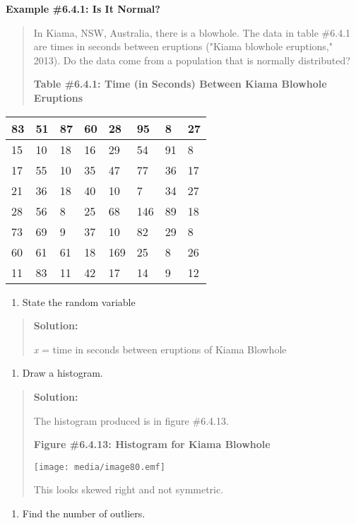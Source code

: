 \documentclass[]{book}
\providecommand{\tightlist}{%
  \setlength{\itemsep}{0pt}\setlength{\parskip}{0pt}}
\begin{document}
\textbf{Example \#6.4.1: Is It Normal?}

\begin{quote}
In Kiama, NSW, Australia, there is a blowhole. The data in table
\#6.4.1 are times in seconds between eruptions ("Kiama blowhole
eruptions," 2013). Do the data come from a population that is
normally distributed?

\textbf{Table \#6.4.1: Time (in Seconds) Between Kiama Blowhole Eruptions }
\end{quote}

\begin{longtable}[]{@{}llllllll@{}}
\toprule
83 & 51 & 87 & 60 & 28 & 95 & 8 & 27\tabularnewline
\midrule
\endhead
15 & 10 & 18 & 16 & 29 & 54 & 91 & 8\tabularnewline
17 & 55 & 10 & 35 & 47 & 77 & 36 & 17\tabularnewline
21 & 36 & 18 & 40 & 10 & 7 & 34 & 27\tabularnewline
28 & 56 & 8 & 25 & 68 & 146 & 89 & 18\tabularnewline
73 & 69 & 9 & 37 & 10 & 82 & 29 & 8\tabularnewline
60 & 61 & 61 & 18 & 169 & 25 & 8 & 26\tabularnewline
11 & 83 & 11 & 42 & 17 & 14 & 9 & 12\tabularnewline
\bottomrule
\end{longtable}

\begin{enumerate}
\def\labelenumi{\alph{enumi}.}
\tightlist
\item
  State the random variable
\end{enumerate}

\begin{quote}
\textbf{Solution:}

\emph{x} = time in seconds between eruptions of Kiama Blowhole
\end{quote}

\begin{enumerate}
\def\labelenumi{\alph{enumi}.}
\setcounter{enumi}{1}
\tightlist
\item
  Draw a histogram.
\end{enumerate}

\begin{quote}
\textbf{Solution:}

The histogram produced is in figure \#6.4.13.

\textbf{Figure \#6.4.13: Histogram for Kiama Blowhole}

\texttt{[image: media/image80.emf]}

This looks skewed right and not symmetric.
\end{quote}

\begin{enumerate}
\def\labelenumi{\alph{enumi}.}
\setcounter{enumi}{2}
\tightlist
\item
  Find the number of outliers.
\end{enumerate}
\end{document}
